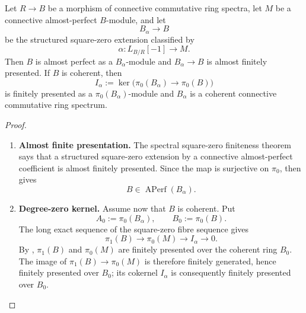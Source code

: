 \begin{lemma}
\label{lem:square-zero-almost-finite}
Let \(R\to B\) be a morphism of connective commutative ring spectra, let
\(M\) be a connective almost-perfect \(B\)-module, and let
\[
    B_\alpha\longrightarrow B
\]
be the structured square-zero extension classified by
\[
    \alpha:L_{B/R}[-1]\longrightarrow M.
\]
Then \(B\) is almost perfect as a \(B_\alpha\)-module and
\(B_\alpha\to B\) is almost finitely presented. If \(B\) is coherent, then
\[
    I_\alpha:=\ker\bigl(\pi_0(B_\alpha)\to\pi_0(B)\bigr)
\]
is finitely presented as a \(\pi_0(B_\alpha)\)-module and \(B_\alpha\) is a
coherent connective commutative ring spectrum.
\end{lemma}

\begin{proof}
\leavevmode
\begin{enumerate}[label=\textup{(\arabic*)}]
    \item \textbf{Almost finite presentation.}
    The spectral square-zero finiteness theorem
    \cite[Corollary~5.2.2.5]{LurieSAG} says that a structured square-zero extension by a
    connective almost-perfect coefficient is almost finitely presented. Since the
    map is surjective on \(\pi_0\),
     then gives
    \[
        B\in\operatorname{APerf}(B_\alpha).
    \]
    \item \textbf{Degree-zero kernel.}
    Assume now that \(B\) is coherent. Put
    \[
        A_0:=\pi_0(B_\alpha),
        \qquad
        B_0:=\pi_0(B).
    \]
    The long exact sequence of the square-zero fibre sequence gives
    \[
        \pi_1(B)\longrightarrow\pi_0(M)
        \longrightarrow I_\alpha\longrightarrow0.
    \]
    By ,
    \(\pi_1(B)\) and \(\pi_0(M)\) are finitely presented over the coherent
    ring \(B_0\). The image of
    \(\pi_1(B)\to\pi_0(M)\) is therefore finitely generated, hence finitely
    presented over \(B_0\); its cokernel \(I_\alpha\) is consequently finitely
    presented over \(B_0\).


\end{enumerate}
\end{proof}
